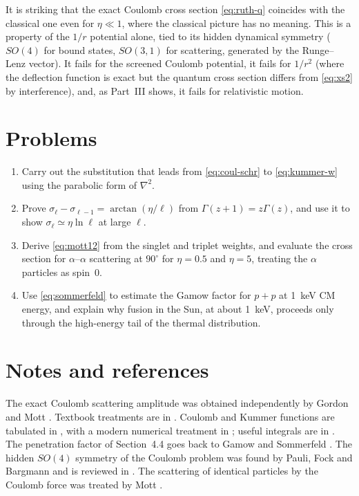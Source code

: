 \documentclass[11pt,a4paper]{book}
\numberwithin{equation}{chapter}
\begin{document}
It is striking that the exact Coulomb cross section \eqref{eq:ruth-q} coincides
with the classical one even for $\eta\ll1$, where the classical picture has no
meaning. This is a property of the $1/r$ potential alone, tied to its hidden
dynamical symmetry ($SO(4)$ for bound states, $SO(3,1)$ for scattering,
generated by the Runge--Lenz vector). It fails for the screened Coulomb
potential, it fails for $1/r^2$ (where the deflection function is exact but the
quantum cross section differs from \eqref{eq:xs2} by interference), and, as
Part~III shows, it fails for relativistic motion.

\section{Problems}
\begin{enumerate}
  \item Carry out the substitution that leads from \eqref{eq:coul-schr} to
        \eqref{eq:kummer-w} using the parabolic form of $\nabla^2$.
  \item Prove $\sigma_\ell-\sigma_{\ell-1}=\arctan(\eta/\ell)$ from
        $\Gamma(z+1)=z\Gamma(z)$, and use it to show $\sigma_\ell\simeq\eta\ln\ell$
        at large $\ell$.
  \item Derive \eqref{eq:mott12} from the singlet and triplet weights, and
        evaluate the cross section for $\alpha$--$\alpha$ scattering at
        $90^\circ$ for $\eta=0.5$ and $\eta=5$, treating the $\alpha$ particles
        as spin~0.
  \item Use \eqref{eq:sommerfeld} to estimate the Gamow factor for $p+p$ at
        1~keV CM energy, and explain why fusion in the Sun, at about 1~keV,
        proceeds only through the high-energy tail of the thermal distribution.
\end{enumerate}

\section*{Notes and references}
The exact Coulomb scattering amplitude was obtained independently by Gordon \cite{GordonB} and Mott \cite{Mott28}. Textbook treatments are in \cite{LL3,Messiah,Newton}. Coulomb and Kummer functions are tabulated in \cite{AS,DLMF}, with a modern numerical treatment in \cite{Seaton02}; useful integrals are in \cite{GR}. The penetration factor of Section~4.4 goes back to Gamow \cite{Gamow28} and Sommerfeld \cite{Sommerfeld31}. The hidden $SO(4)$ symmetry of the Coulomb problem was found by Pauli, Fock and Bargmann \cite{Pauli26,Fock35,Bargmann36} and is reviewed in \cite{Bander66}. The scattering of identical particles by the Coulomb force was treated by Mott \cite{Mott30}.
\end{document}
